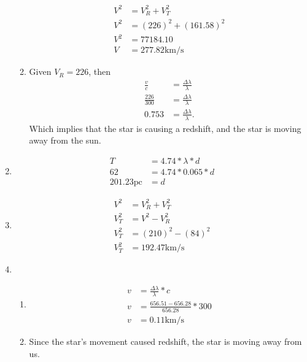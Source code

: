 \documentclass{article}
\begin{document}
\begin{enumerate}
\begin{enumerate}
        \begin{align*}
            V^2 &= V_R^2+V_T^2\\
            V^2 &= (226)^2+(161.58)^2\\
            V^2 &= 77184.10\\
            V &= 277.82 \text{km/s}
        \end{align*}
        
        \item
        
        Given $V_R = 226$, then
        \begin{align*}
            \frac{v}{c} &= \frac{\Delta\lambda}{\lambda}\\
            \frac{226}{300} &= \frac{\Delta\lambda}{\lambda}\\
            0.753 &= \frac{\Delta\lambda}{\lambda}.
        \end{align*} Which implies that the star is causing a redshift, and the star is moving away from the sun.
        
    \end{enumerate}
    
    \item
    
    \begin{align*}
        T &= 4.74*\lambda*d\\
        62 &= 4.74*0.065*d\\
        201.23\text{pc} &= d
    \end{align*}
    
    \item
    
    \begin{align*}
        V^2 &= V_R^2+V_T^2\\
        V_T^2 &= V^2 - V_R^2\\
        V_T^2 &= (210)^2 - (84)^2\\
        V_T^2 &= 192.47 \text{km/s}
    \end{align*}
    
    \item
    
    \begin{enumerate}
        \item 
        
        \begin{align*}
            v &= \frac{\Delta\lambda}{\lambda}*c\\
            v &= \frac{656.51-656.28}{656.28}*300\\
            v &= 0.11\text{km/s}
        \end{align*}
        
        \item
        
        Since the star's movement caused redshift, the star is moving away from us.
        
    \end{enumerate}
    
\end{enumerate}
\end{document}
